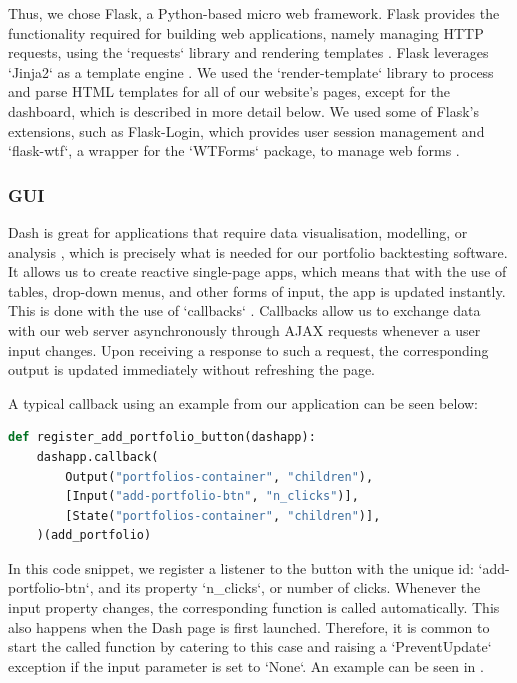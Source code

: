 \documentclass[main.tex]{subfiles}
\begin{document}
Thus, we chose Flask, a Python-based micro web framework. Flask provides the functionality required for building web applications, namely managing HTTP requests, using the `requests` library and rendering templates \cite{smyth_2018}. Flask leverages `Jinja2` as a template engine \cite{templates_2010}. We used the `render-template` library to process and parse HTML templates for all of our website's pages, except for the dashboard, which is described in more detail below. We used some of Flask's extensions, such as Flask-Login, which provides user session management\cite{flask-login} and `flask-wtf`, a wrapper for the `WTForms` package, to manage web forms \cite{wtforms-documentation}.

\subsubsection{GUI}
\label{GUI}

Dash is great for applications that require data visualisation, modelling, or analysis \cite{dash}, which is precisely what is needed for our portfolio backtesting software. It allows us to create reactive single-page apps, which means that with the use of tables, drop-down menus, and other forms of input, the app is updated instantly. This is done with the use of `callbacks` \cite{callbacks}. Callbacks allow us to exchange data with our web server asynchronously through AJAX requests whenever a user input changes. Upon receiving a response to such a request, the corresponding output is updated immediately without refreshing the page.

A typical callback using an example from our application can be seen below:

\begin{lstlisting}[language=Python, caption=setup.py - Development environment, label=lst:callback_example]
def register_add_portfolio_button(dashapp):
    dashapp.callback(
        Output("portfolios-container", "children"),
        [Input("add-portfolio-btn", "n_clicks")],
        [State("portfolios-container", "children")],
    )(add_portfolio)
\end{lstlisting}


In this code snippet, we register a listener to the button with the unique id: `add-portfolio-btn`, and its property `n\_clicks`, or number of clicks. Whenever the input property changes, the corresponding function is called automatically. This also happens when the Dash page is first launched. Therefore, it is common to start the called function by catering to this case and raising a `PreventUpdate` exception if the input parameter is set to `None`. An example can be seen in \cite{prevent_update}.
\end{document}
